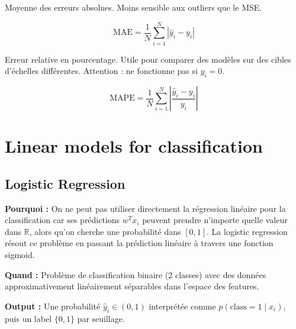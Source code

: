 \documentclass[11pt,a4paper,openany]{book}
\begin{document}
\vspace{0.4cm}

\begin{defnbox}[title=Mean Absolute Error (MAE)]
Moyenne des erreurs absolues. Moins sensible aux outliers que le MSE.

\[
\mathrm{MAE} = \frac{1}{N} \sum_{i=1}^{N} |\hat{y}_i - y_i|
\]
\end{defnbox}

\vspace{0.4cm}

\begin{defnbox}[title=Mean Absolute Percentage Error (MAPE)]
Erreur relative en pourcentage. Utile pour comparer des modèles sur des cibles d'échelles différentes. Attention : ne fonctionne pas si $y_i = 0$.

\[
\mathrm{MAPE} = \frac{1}{N} \sum_{i=1}^{N} \left| \frac{\hat{y}_i - y_i}{y_i} \right|
\]
\end{defnbox}

\newpage \section{Linear models for classification}

\vspace{8cm}


\subsection{Logistic Regression}

\begin{rembox}[title=Pourquoi et quand utiliser la logistic regression ?]
\textbf{Pourquoi :} On ne peut pas utiliser directement la régression linéaire pour la classification car ses prédictions $w^T x_i$ peuvent prendre n'importe quelle valeur dans $\mathbb{R}$, alors qu'on cherche une probabilité dans $[0, 1]$. La logistic regression résout ce problème en passant la prédiction linéaire à travers une fonction sigmoid.

\vspace{0.3cm}

\textbf{Quand :} Problème de classification binaire (2 classes) avec des données approximativement linéairement séparables dans l'espace des features.

\vspace{0.3cm}

\textbf{Output :} Une probabilité $\hat{y}_i \in (0, 1)$ interprétée comme $p(\text{class} = 1 \mid x_i)$, puis un label $\{0, 1\}$ par seuillage.
\end{rembox}
\end{document}
